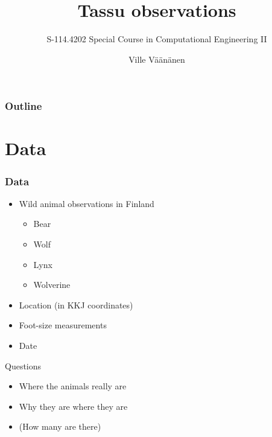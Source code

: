 \documentclass[t]{beamer}
\title[Tassu observations]{%
	Tassu observations
}
\subtitle[S-114.4202]{%
	S-114.4202 Special Course in Computational Engineering II
}
\author[Väänänen]{%
	Ville Väänänen
}
\institute[Aalto University School of Science]{%
	Aalto University School of Science
}
\begin{document}

\maketitle

\begin{frame}
	\frametitle{Outline}
	\tableofcontents
\end{frame}
\section{Data}

\begin{frame}
	\frametitle{Data}
	\vskip -15pt
	\begin{itemize}
  		\item Wild animal observations in Finland
  		\begin{itemize}
  \item Bear
  \item Wolf
  \item Lynx
  \item Wolverine
	\end{itemize}
  		\item Location (in KKJ coordinates)
  		\item Foot-size measurements
  		\item Date  
	\end{itemize}
	\item{Questions}
	\begin{itemize}
  \item Where the animals really are
  \item Why they are where they are
  \item (How many are there)
\end{itemize}
\end{frame}
	
\end{document}
